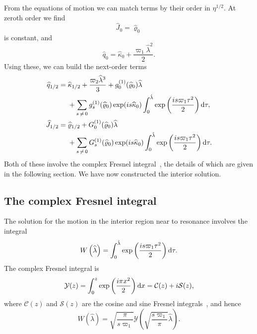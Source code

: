 From the equations of motion we can match terms by their order in $\eta^{1/2}$. At zeroth order we find
\begin{equation}
\widehat{J}_0 = \widehat{\varrho}_0
\end{equation}
is constant, and
\begin{equation}
\widehat{q}_0 = \widehat{\kappa}_0 + \dfrac{\varpi_1\widehat{\lambda}^2}{2}.
\end{equation}
Using these, we can build the next-order terms
\begin{align}
\widehat{q}_{1/2} = {} & \widehat{\kappa}_{1/2} + \dfrac{\varpi_2\widehat{\lambda}^3}{3} + g_0^{(1)}(\widehat{\varrho}_0)\widehat{\lambda} \nonumber \\ 
 {} & + \sum_{s\,\neq\,0}g_s^{(1)}(\widehat{\varrho}_0)\exp(is \widehat{\kappa}_0)\int_{0}^{\hat{\lambda}}{\exp\left(\dfrac{is \varpi_1\tau^2}{2}\right)}\,\mathrm{d}{\tau}, \\
\widehat{J}_{1/2} = {} & \widehat{\varrho}_{1/2} + G_0^{(1)}(\widehat{\varrho}_0)\widehat{\lambda} \nonumber \\
 {} & + \sum_{s\,\neq\,0}G_s^{(1)}(\widehat{\varrho}_0)\exp(is \widehat{\kappa}_0)\int_{0}^{\hat{\lambda}}{\exp\left(\dfrac{is \varpi_1\tau^2}{2}\right)}\,\mathrm{d}{\tau}.
\end{align}
Both of these involve the complex Fresnel integral~\cite{Olver2010}, the details of which are given in the following section. We have now constructed the interior solution. %

\subsection{The complex Fresnel integral}

The solution for the motion in the interior region near to resonance involves the integral
\begin{equation}
W\left(\widehat{\lambda}\right) = \int_{0}^{\hat{\lambda}}{\exp\left(\dfrac{is \varpi_1\tau^2}{2}\right)}\,\mathrm{d}{\tau}.
\end{equation}
The complex Fresnel integral is
\begin{equation}
\mathcal{Y}(z) = \int_{0}^{z}{\exp\left(\dfrac{i\pi x^2}{2}\right)}\,\mathrm{d}{x} = \mathcal{C}(z) + i\mathcal{S}(z),
\end{equation}
where $\mathcal{C}(z)$ and $\mathcal{S}(z)$ are the cosine and sine Fresnel integrals~\cite{Olver2010}, and hence %
\begin{equation}
W\left(\widehat{\lambda}\right) = \sqrt{\dfrac{\pi}{s\varpi_1}}\mathcal{Y}\left(\sqrt{\dfrac{s\varpi_1}{\pi}}\widehat{\lambda}\right).
\end{equation}

